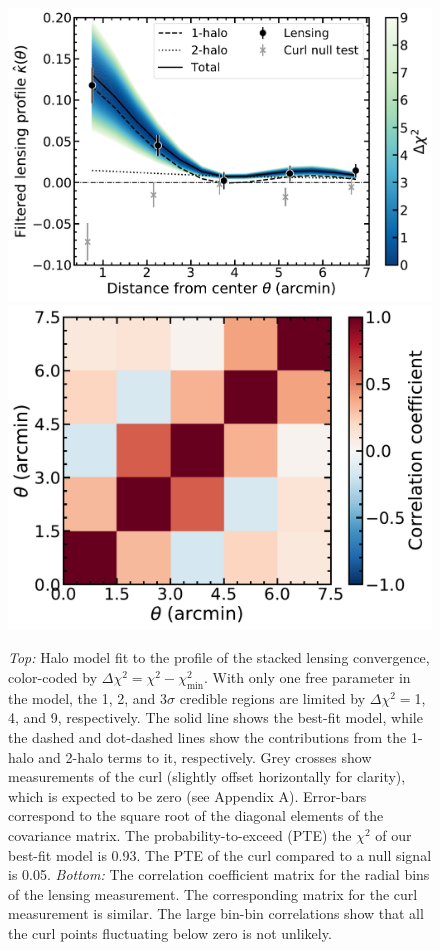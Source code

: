 \documentclass[preprint2]{aastex63}
\newcommand{\curlpte}{0.05}
\newcommand{\fitpte}{0.93}
\begin{document}
\begin{figure}[htp]
    \centering
    \includegraphics[width=0.95\columnwidth]{fig3a.pdf}
    \includegraphics[width=0.92\linewidth]{fig3b.pdf}
    \caption{\textit{Top:} Halo model fit to the profile of the stacked lensing convergence, color-coded by $\Delta\chi^2=\chi^2-\chi^2_\mathrm{min}$. With only one free parameter in the model, the 1, 2, and 3$\sigma$ credible regions are limited by $\Delta\chi^2=$1, 4, and 9, respectively. The solid line shows the best-fit model, while the dashed and dot-dashed lines show the contributions from the 1-halo and 2-halo terms to it, respectively. Grey crosses show measurements of the curl (slightly offset horizontally for clarity), which is expected to be zero (see Appendix A). Error-bars correspond to the square root of the diagonal elements of the covariance matrix. The probability-to-exceed (PTE) the $\chi^2$ of our best-fit model is \fitpte. The PTE of the curl compared to a null signal is \curlpte.
    \textit{Bottom:} The correlation coefficient matrix for the radial bins of the lensing measurement. The corresponding matrix for the curl measurement is similar. The large bin-bin correlations show that all the curl points fluctuating below zero is not unlikely.  }
    \label{fig:profile}
\end{figure}
\end{document}

